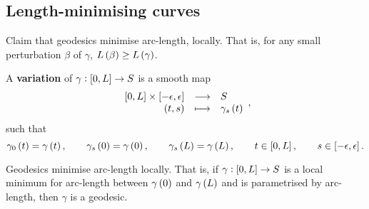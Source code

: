 \pagebreak

\subsection{Length-minimising curves}


Claim that geodesics minimise arc-length, locally. That is, for any small perturbation $ \beta $ of $ \gamma $, $ L\br{\beta} \ge L\br{\gamma} $.

\begin{definition}
A \textbf{variation} of $ \gamma : \sbr{0, L} \to S $ is a smooth map
$$ \function{\sbr{0, L} \times \sbr{-\epsilon, \epsilon}}{S}{\br{t, s}}{\gamma_s\br{t}}, $$
such that
$$ \gamma_0\br{t} = \gamma\br{t}, \qquad \gamma_s\br{0} = \gamma\br{0}, \qquad \gamma_s\br{L} = \gamma\br{L}, \qquad t \in \sbr{0, L}, \qquad s \in \sbr{-\epsilon, \epsilon}. $$
\end{definition}

\begin{proposition}
Geodesics minimise arc-length locally. That is, if $ \gamma : \sbr{0, L} \to S $ is a local minimum for arc-length between $ \gamma\br{0} $ and $ \gamma\br{L} $ and is parametrised by arc-length, then $ \gamma $ is a geodesic.
\end{proposition}

